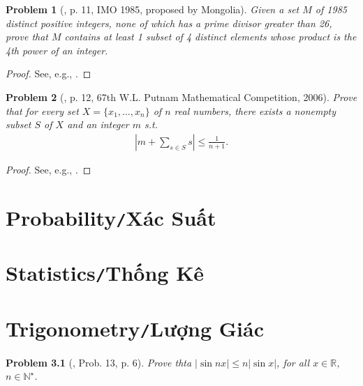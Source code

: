 \documentclass[oneside]{book}
\numberwithin{equation}{section}
\newtheorem{problem}{Problem}[section]
\begin{document}
\begin{problem}[\cite{Gelca_Andreescu2017}, p. 11, IMO 1985, proposed by Mongolia]
	Given a set $M$ of 1985 distinct positive integers, none of which has a prime divisor greater than 26, prove that $M$ contains at least 1 subset of 4 distinct elements whose product is the 4th power of an integer.
\end{problem}

\begin{proof}[Proof]
	See, e.g., \cite[pp. 11--12]{Gelca_Andreescu2017}.
\end{proof}

\begin{problem}[\cite{Gelca_Andreescu2017}, p. 12, 67th W.L. Putnam Mathematical Competition, 2006]
	Prove that for every set $X = \{x_1,\ldots,x_n\}$ of $n$ real numbers, there exists a nonempty subset $S$ of $X$ and an integer $m$ s.t.
	\begin{align*}
		\left|m + \sum_{s\in S} s\right|\le\frac{1}{n + 1}.
	\end{align*}
\end{problem}

\begin{proof}[Proof]
	See, e.g., \cite[p. 12]{Gelca_Andreescu2017}.
\end{proof}


\chapter{Probability\texttt{/}Xác Suất}


\chapter{Statistics\texttt{/}Thống Kê}


\chapter{Trigonometry\texttt{/}Lượng Giác}

\begin{problem}[\cite{Gelca_Andreescu2017}, Prob. 13, p. 6]
	Prove thta $|\sin nx|\le n|\sin x|$, for all $x\in\mathbb{R}$, $n\in\mathbb{N}^\star$.
\end{problem}
\end{document}

